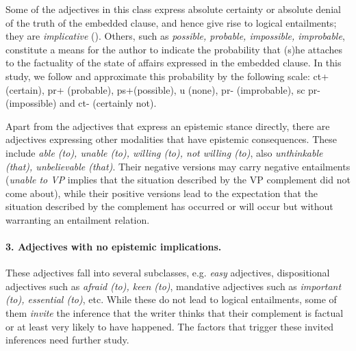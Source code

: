 \documentclass[10pt]{article}
\begin{document}
Some of the adjectives in this class express absolute certainty or absolute denial of the truth of the embedded clause, and hence give rise to logical entailments; they are \textit{implicative} (\cite{karttunen:1971}). Others, such as \textit{possible, probable, impossible, improbable}, 
constitute a means for the author  to indicate the probability that (s)he attaches to the factuality of the state of affairs expressed in the embedded clause. In this study, we follow \cite{sauri:2008phd} and approximate this probability by the following scale: {\sc ct}+ (certain), {\sc pr}+ (probable), {\sc ps}+(possible), {\sc u} (none), {\sc pr}- (improbable), {sc pr}- (impossible) and {\sc ct}- (certainly not).

Apart from the adjectives that express an epistemic stance directly, there are adjectives expressing other modalities that have epistemic consequences. These include \textit{able (to), unable (to), willing (to), not willing (to)}, also \textit{unthinkable (that), unbelievable (that)}. Their negative versions may carry negative entailments (\textit{unable to VP} implies that the situation 
described  by the VP complement did not come about), while their positive versions lead to the expectation that the situation described by the complement has occurred or will occur but without warranting an entailment relation.

\vspace{-.2in}
\paragraph{3. Adjectives with no epistemic implications.}
These adjectives fall into several subclasses, e.g. \textit{easy} adjectives, dispositional adjectives such as \textit{afraid (to), keen (to)}, mandative adjectives such as \textit{important (to), essential (to)}, etc. While these do not lead to logical entailments, some of them \textit{invite} the inference that the writer thinks that their complement is factual or at least very likely to have happened. The factors that trigger these invited inferences need further study.
\end{document}
